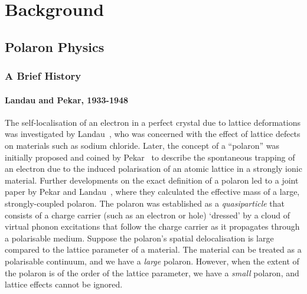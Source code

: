 \chapter{Background}
\label{chap:second}



\section{Polaron Physics}
\label{sec:2-1}

\subsection{A Brief History}
\label{subsec:2-1-1}

\subsubsection{Landau and Pekar, 1933-1948}
\label{subsubsec:2-1-1-1}

The self-localisation of an electron in a perfect crystal due to lattice deformations was investigated by Landau~\cite{landau_motion_1933}, who was concerned with the effect of lattice defects on materials such as sodium chloride. Later, the concept of a ``polaron'' was initially proposed and coined by Pekar~\cite{pekar_local_1946, pekar_notitle_1946, pekar_notitle_1947} to describe the spontaneous trapping of an electron due to the induced polarisation of an atomic lattice in a strongly ionic material. Further developments on the exact definition of a polaron led to a joint paper by Pekar and Landau~\cite{pekar_effective_1948}, where they calculated the effective mass of a large,  strongly-coupled polaron. The polaron was established as a \emph{quasiparticle} that consists of a charge carrier (such as an electron or hole) `dressed' by a cloud of virtual phonon excitations that follow the charge carrier as it propagates through a polarisable medium. Suppose the polaron's spatial delocalisation is large compared to the lattice parameter of a material. The material can be treated as a polarisable continuum, and we have a \emph{large} polaron. However, when the extent of the polaron is of the order of the lattice parameter, we have a \emph{small} polaron, and lattice effects cannot be ignored.

